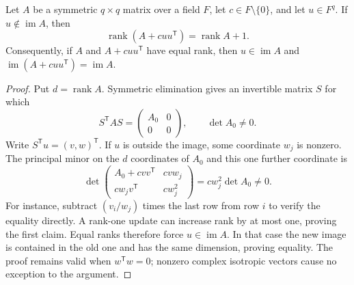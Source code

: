 \begin{lemma}\label{cr:rankone}
Let $A$ be a symmetric $q\times q$ matrix over a field $F$, let
$c\in F\setminus\{0\}$, and let $u\in F^q$.
If $u\notin\operatorname{im}A$, then
\[
 \operatorname{rank}(A+cuu^{\mathsf T})=\operatorname{rank}A+1.
\]
Consequently, if $A$ and $A+cuu^{\mathsf T}$ have equal rank, then
$u\in\operatorname{im}A$ and
$\operatorname{im}(A+cuu^{\mathsf T})=\operatorname{im}A$.
\end{lemma}
\begin{proof}
Put $d=\operatorname{rank}A$.  Symmetric elimination gives an
invertible matrix $S$ for which
\[
 S^{\mathsf T}AS=\begin{pmatrix}A_0&0\\0&0\end{pmatrix},
 \qquad \det A_0\ne0.
\]
Write $S^{\mathsf T}u=(v,w)^{\mathsf T}$.  If $u$ is outside
the image, some coordinate $w_j$ is nonzero.  The principal minor
on the $d$ coordinates of $A_0$ and this one further coordinate is
\begin{equation}\label{cr:minor}
 \det\begin{pmatrix}
 A_0+cvv^{\mathsf T}&cvw_j\\
 cw_jv^{\mathsf T}&cw_j^2
 \end{pmatrix}=cw_j^2\det A_0\ne0.
\end{equation}
For instance, subtract $(v_i/w_j)$ times the last row from row $i$
to verify the equality directly.  A rank-one update can increase
rank by at most one, proving the first claim.  Equal ranks therefore
force $u\in\operatorname{im}A$.  In that case the new image is
contained in the old one and has the same dimension, proving equality.
The proof remains valid when $w^{\mathsf T}w=0$; nonzero complex
isotropic vectors cause no exception to the argument.
\end{proof}

